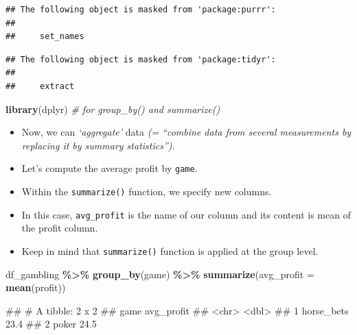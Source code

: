 \documentclass[
]{book}
\newenvironment{Shaded}{\begin{snugshade}}{\end{snugshade}}
\newcommand{\AttributeTok}[1]{\textcolor[rgb]{0.13,0.29,0.53}{#1}}
\newcommand{\CommentTok}[1]{\textcolor[rgb]{0.56,0.35,0.01}{\textit{#1}}}
\newcommand{\FunctionTok}[1]{\textcolor[rgb]{0.13,0.29,0.53}{\textbf{#1}}}
\newcommand{\NormalTok}[1]{#1}
\newcommand{\SpecialCharTok}[1]{\textcolor[rgb]{0.81,0.36,0.00}{\textbf{#1}}}
\begin{document}
\begin{verbatim}
## The following object is masked from 'package:purrr':
## 
##     set_names
\end{verbatim}

\begin{verbatim}
## The following object is masked from 'package:tidyr':
## 
##     extract
\end{verbatim}

\begin{Shaded}
\begin{Highlighting}[]
\FunctionTok{library}\NormalTok{(dplyr) }\CommentTok{\# for group\_by() and summarize()}
\end{Highlighting}
\end{Shaded}

\begin{itemize}
\item
  Now, we can \emph{`aggregate'} data \emph{(= ``combine data from several measurements by replacing it by summary statistics'')}.
\item
  Let's compute the average profit by \texttt{game}.
\item
  Within the \texttt{summarize()} function, we specify new columns.
\item
  In this case, \texttt{avg\_profit} is the name of our column and its content is mean of the profit column.
\item
  Keep in mind that \texttt{summarize()} function is applied at the group level.
\end{itemize}

\begin{Shaded}
\begin{Highlighting}[]
\NormalTok{df\_gambling }\SpecialCharTok{\%\textgreater{}\%} 
  \FunctionTok{group\_by}\NormalTok{(game) }\SpecialCharTok{\%\textgreater{}\%} 
  \FunctionTok{summarize}\NormalTok{(}\AttributeTok{avg\_profit =} \FunctionTok{mean}\NormalTok{(profit))}
\end{Highlighting}
\end{Shaded}

\begin{Shaded}
\begin{Highlighting}[]
\NormalTok{\#\# \# A tibble: 2 x 2}
\NormalTok{\#\#   game       avg\_profit}
\NormalTok{\#\#   \textless{}chr\textgreater{}           \textless{}dbl\textgreater{}}
\NormalTok{\#\# 1 horse\_bets       23.4}
\NormalTok{\#\# 2 poker            24.5}
\end{Highlighting}
\end{Shaded}
\end{document}
